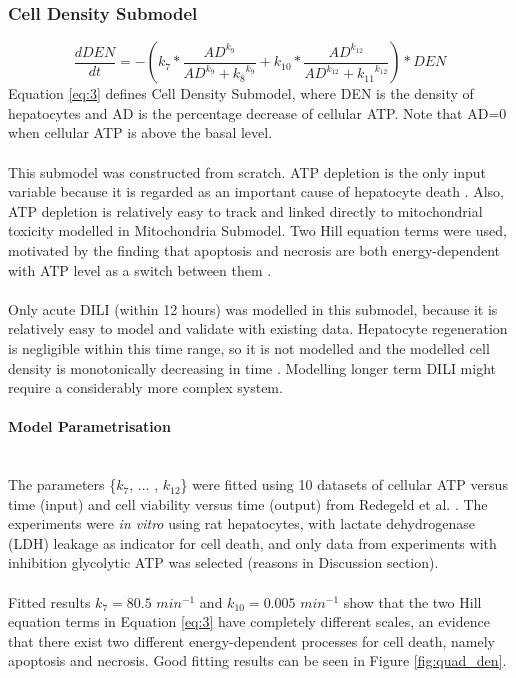 \documentclass[12pt]{article}
\newcommand{\myparagraph}[1]{\paragraph{#1}\mbox{}\\}
\begin{document}
\subsubsection{Cell Density Submodel}
\begin{equation}\frac{d DEN}{dt}= -(k_7*\frac{{AD}^{k_9}}{{ AD}^{k_9}+{k_{8}}^{k_9}}+k_{10}*\frac{{AD}^{k_{12}}}{{ AD}^{k_{12}}+{k_{11}}^{k_{12}}})*DEN 
\label{eq:3}
\end{equation}
Equation \ref{eq:3} defines Cell Density Submodel, where DEN is the density of hepatocytes and AD is the percentage decrease of cellular ATP. Note that AD=0 when cellular ATP is above the basal level.\\\\ 
This submodel was constructed from scratch. ATP depletion is the only input variable because it is regarded as an important cause of hepatocyte death \cite{redegeldDepletionATPNot1992}. Also, ATP depletion is relatively easy to track and linked directly to mitochondrial toxicity modelled in Mitochondria Submodel. Two Hill equation terms were used, motivated by the finding that apoptosis and necrosis are both energy-dependent with ATP level as a switch between them \cite{leistIntracellularAdenosineTriphosphate1997a,tsujimotoApoptosisNecrosisIntracellular1997}.\\\\
Only acute DILI (within 12 hours) was modelled in this submodel, because it is relatively easy to model and validate with existing data. Hepatocyte regeneration is negligible within this time range, so it is not modelled and the modelled cell density is monotonically decreasing in time \cite{furchtgottModelLiverRegeneration2009}. Modelling longer term DILI might require a considerably more complex system.
\myparagraph{Model Parametrisation}
The parameters \{$k_7$, ... , $k_{12}$\} were fitted using 10 datasets of cellular ATP versus time (input) and cell viability versus time (output) from Redegeld et al. \cite{redegeldDepletionATPNot1992,redegeldInteractionCellularATP1990}. The experiments were \textit{in vitro} using rat hepatocytes, with lactate dehydrogenase (LDH) leakage as indicator for cell death, and only data from experiments with inhibition glycolytic ATP was selected (reasons in Discussion section).\\\\
Fitted results $k_7=80.5$ $min^{-1}$ and $k_{10}=0.005$ $min^{-1}$ show that the two Hill equation terms in Equation \ref{eq:3} have completely different scales, an evidence that there exist two different energy-dependent processes for cell death, namely apoptosis and necrosis. Good fitting results can be seen in Figure \ref{fig:quad_den}.
\end{document}
